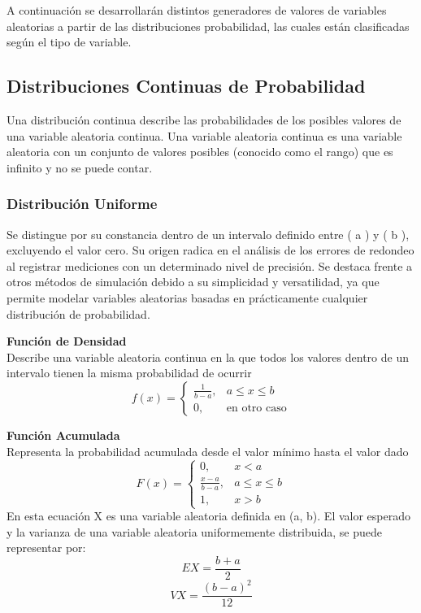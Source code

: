 \documentclass[11pt]{article}
\begin{document}
A continuación se desarrollarán distintos generadores de valores de variables aleatorias a partir de las distribuciones probabilidad, las cuales están clasificadas según el tipo de variable.


\subsection{Distribuciones Continuas de Probabilidad}
  Una distribución continua describe las probabilidades de los posibles valores de una variable aleatoria continua. Una variable aleatoria continua es una variable aleatoria con un conjunto de valores posibles (conocido como el rango) que es infinito y no se puede contar.

\subsubsection{Distribución Uniforme}
  Se distingue por su constancia dentro de un intervalo definido entre ( a ) y ( b ), excluyendo el valor cero. Su origen radica en el análisis de los errores de redondeo al registrar mediciones con un determinado nivel de precisión. Se destaca frente a otros métodos de simulación debido a su simplicidad y versatilidad, ya que permite modelar variables aleatorias basadas en prácticamente cualquier distribución de probabilidad.


\noindent\textbf{Función de Densidad}\\
Describe una variable aleatoria continua en la que todos los valores dentro de un intervalo tienen la misma probabilidad de ocurrir
\[
f(x) = 
\begin{cases}
\frac{1}{b - a}, & a \leq x \leq b \\
0, & \text{en otro caso}
\end{cases}
\]

\noindent\textbf{Función Acumulada}\\
Representa la probabilidad acumulada desde el valor mínimo hasta el valor dado
\[
F(x) = 
\begin{cases}
0, & x < a \\
\frac{x - a}{b - a}, & a \leq x \leq b \\
1, & x > b
\end{cases}
\]
En esta ecuación  X es una variable aleatoria definida en (a, b). El valor esperado y la varianza de una variable aleatoria uniformemente distribuida, se puede representar por:
  \begin{equation}
    EX = \frac{b+a}{2}
  \end{equation}
  \begin{equation}
    VX = \frac{(b-a)^2}{12}
  \end{equation}
\end{document}
